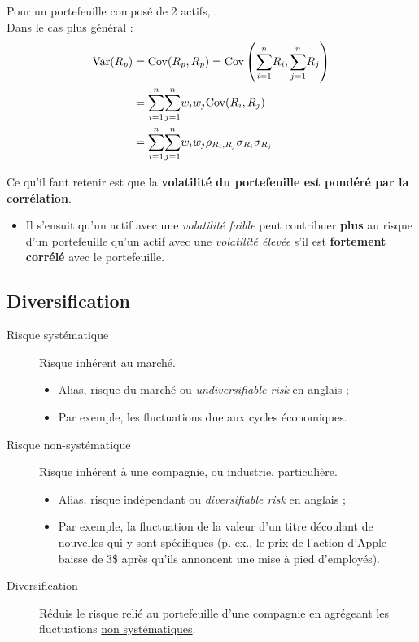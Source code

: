 \documentclass[10pt, french]{article}
\begin{document}
\begin{multicols*}{2}
Pour un portefeuille composé de 2 actifs, .\\
Dans le cas plus général : 
\begin{align*}
	\text{Var}(R_{p})	
	&=	\text{Cov}(R_{p}, R_{p})
	=	\text{Cov}\left(\overset{n}{\underset{i	=	1}{\sum}}R_{i}, \overset{n}{\underset{j	=	1}{\sum}}R_{j}\right)	\\
	&=	\overset{n}{\underset{i	=	1}{\sum}}\overset{n}{\underset{j	=	1}{\sum}} w_{i}w_{j} \text{Cov}(R_{i}, R_{j})	\\
	&=	\overset{n}{\underset{i	=	1}{\sum}}\overset{n}{\underset{j	=	1}{\sum}} w_{i}w_{j} \rho_{R_{i}, R_{j}} \sigma_{R_{i}}	\sigma_{R_{j}}	
\end{align*}

Ce qu'il faut retenir est que la \textbf{volatilité du portefeuille est pondéré par la corrélation}. 
\begin{itemize}
	\item	Il s'ensuit qu'un actif avec une \textit{volatilité faible} peut contribuer \textbf{plus} au risque d'un portefeuille qu'un actif avec une \textit{volatilité élevée} s'il est \textbf{fortement corrélé} avec le portefeuille.
\end{itemize}



\columnbreak
\subsection{Diversification}
\begin{definitionNOHFILLprop}
\begin{description}
	\item[Risque systématique]	Risque inhérent au marché. 
		\begin{itemize}
		\item	Alias, risque du marché ou \og \textit{undiversifiable risk} \fg{} en anglais ;
		\item	Par exemple, les fluctuations due aux cycles économiques.
		\end{itemize}
	\item[Risque non-systématique]	Risque inhérent à une compagnie, ou industrie, particulière.
		\begin{itemize}
		\item	Alias, risque indépendant ou \og \textit{diversifiable risk} \fg{} en anglais ;
		\item	Par exemple, la fluctuation de la valeur d'un titre découlant de nouvelles qui y sont spécifiques (p. ex., le prix de l'action d'Apple baisse de 3\$ après qu'ils annoncent une mise à pied d'employés).
		\end{itemize}
	\item[Diversification]	Réduis le risque relié au portefeuille d'une compagnie en agrégeant les fluctuations \underline{non systématiques}. 
\end{description}
\end{definitionNOHFILLprop}


\end{multicols*}
\end{document}
